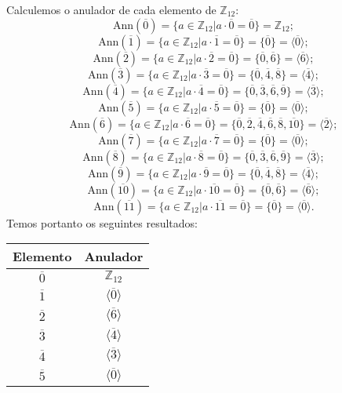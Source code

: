 \documentclass[11pt,a4paper]{article}
\begin{document}
{Calculemos o anulador de cada elemento de $\mathbb{Z}_{12}:$
\[
\mbox{Ann}(\overline{0}) = \{a \in \mathbb{Z}_{12} | a \cdot \overline{0} = \overline{0} \} = \mathbb{Z}_{12};
\]
\[
\mbox{Ann}(\overline{1}) = \{a \in \mathbb{Z}_{12} | a \cdot \overline{1} = \overline{0} \} = \{ \overline{0} \} = \langle \overline{0} \rangle;
\]
\[
\mbox{Ann}(\overline{2}) = \{a \in \mathbb{Z}_{12} | a \cdot \overline{2} = \overline{0} \} = \{ \overline{0}, \overline{6} \} = \langle \overline{6} \rangle;
\]
\[
\mbox{Ann}(\overline{3}) = \{a \in \mathbb{Z}_{12} | a \cdot \overline{3} = \overline{0} \} = \{ \overline{0}, \overline{4}, \overline{8} \} = \langle \overline{4} \rangle;
\]
\[
\mbox{Ann}(\overline{4}) = \{a \in \mathbb{Z}_{12} | a \cdot \overline{4} = \overline{0} \} = \{ \overline{0}, \overline{3}, \overline{6}, \overline{9} \} = \langle \overline{3} \rangle;
\]
\[
\mbox{Ann}(\overline{5}) = \{a \in \mathbb{Z}_{12} | a \cdot \overline{5} = \overline{0} \} = \{ \overline{0} \} = \langle \overline{0} \rangle;
\]
\[
\mbox{Ann}(\overline{6}) = \{a \in \mathbb{Z}_{12} | a \cdot \overline{6} = \overline{0} \} = \{ \overline{0}, \overline{2}, \overline{4}, \overline{6}, \overline{8}, \overline{10} \} = \langle \overline{2} \rangle;
\]
\[
\mbox{Ann}(\overline{7}) = \{a \in \mathbb{Z}_{12} | a \cdot \overline{7} = \overline{0} \} = \{ \overline{0} \} = \langle \overline{0} \rangle;
\]
\[
\mbox{Ann}(\overline{8}) = \{a \in \mathbb{Z}_{12} | a \cdot \overline{8} = \overline{0} \} = \{ \overline{0}, \overline{3}, \overline{6}, \overline{9}\} = \langle \overline{3} \rangle;
\]
\[
\mbox{Ann}(\overline{9}) = \{a \in \mathbb{Z}_{12} | a \cdot \overline{9} = \overline{0} \} = \{ \overline{0}, \overline{4}, \overline{8}\} = \langle \overline{4} \rangle;
\]
\[
\mbox{Ann}(\overline{10}) = \{a \in \mathbb{Z}_{12} | a \cdot \overline{10} = \overline{0} \} = \{ \overline{0}, \overline{6}\} = \langle \overline{6} \rangle;
\]
\[
\mbox{Ann}(\overline{11}) = \{a \in \mathbb{Z}_{12} | a \cdot \overline{11} = \overline{0} \} = \{ \overline{0} \} = \langle \overline{0} \rangle.
\]
Temos portanto os seguintes resultados:
 \begin{table}[h]
 \begin{minipage}{.5\textwidth}
 \centering
 \begin{tabular}{|c|c|}
 \toprule
 Elemento & Anulador \\ \hline
$\overline{0}$ & $\mathbb{Z}_{12}$ \\\hline
$\overline{1}$ & $\langle \overline{0} \rangle$ \\\hline
$\overline{2}$ & $\langle \overline{6} \rangle$ \\\hline
$\overline{3}$ & $\langle \overline{4} \rangle$ \\\hline
$\overline{4}$ & $\langle \overline{3} \rangle$ \\\hline
$\overline{5}$ & $\langle \overline{0} \rangle$ \\ \hline
 \end{tabular}
  

\end{minipage}
\end{table}}
\end{document}
